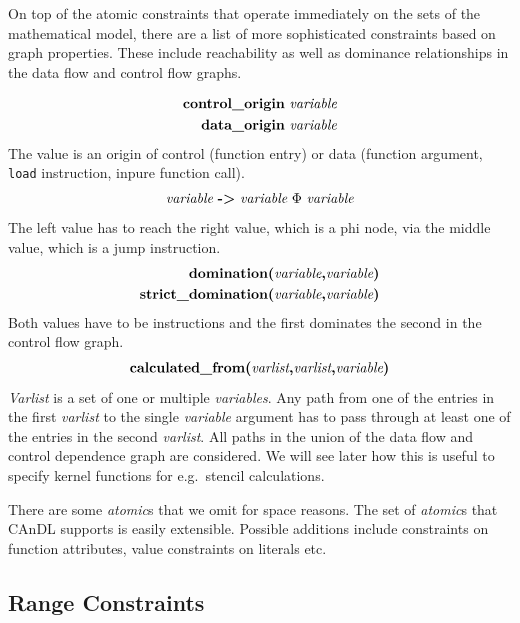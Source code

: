     On top of the atomic constraints that operate immediately on the sets of
    the mathematical model, there are a list of more sophisticated constraints
    based on graph properties.
    These include reachability as well as dominance relationships in the data
    flow and control flow graphs.

    \begin{align*}
        \text{\bf control\_origin}&\ \text{\it variable}\\
        \text{\bf data\_origin}&\ \text{\it variable}
    \end{align*}
    The value is an origin of control (function entry) or data (function argument, {\tt load} instruction, inpure function call).
    \begin{align*}
        \text{\it variable}\ \text{\bf ->}\ \text{\it variable}\ \Phi\ \text{\it variable}
    \end{align*}
    The left value has to reach the right value, which is a phi node, via the middle value, which is a jump instruction.
    \begin{align*}
        \text{\bf domination(}\text{\it variable}\text{\bf,} \text{\it variable}\text{\bf)}&\\
        \text{\bf strict\_domination(}\text{\it variable}\text{\bf,} \text{\it variable}\text{\bf)}&
    \end{align*}
    Both values have to be instructions and the first dominates the second in the control flow graph.
    \begin{align*}
        \text{\bf calculated\_from(}\text{\it varlist}\text{\bf,}\text{\it varlist}\text{\bf,}\text{\it variable}\text{\bf)}
    \end{align*}
    {\it Varlist} is a set of one or multiple {\it variables}.
    Any path from one of the entries in the first {\it varlist} to the single
    {\it variable} argument has to pass through at least one of the entries in
    the second {\it varlist}.
    All paths in the union of the data flow and control dependence graph are
    considered.
    We will see later how this is useful to specify kernel functions for
    e.g.\ stencil calculations.

    There are some {\it atomic}s that we omit for space reasons.
    The set of {\it atomic}s that CAnDL supports is easily extensible.
    Possible additions include constraints on function attributes, value
    constraints on literals etc.

\newpage
\subsection{Range Constraints}

